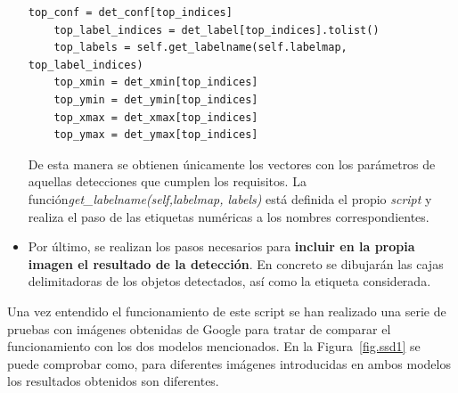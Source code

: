 \begin{itemize}
\begin{lstlisting}[frame=single]
	top_conf = det_conf[top_indices]
	top_label_indices = det_label[top_indices].tolist()
	top_labels = self.get_labelname(self.labelmap, top_label_indices)
	top_xmin = det_xmin[top_indices]
	top_ymin = det_ymin[top_indices]
	top_xmax = det_xmax[top_indices]
	top_ymax = det_ymax[top_indices]
	\end{lstlisting}
	De esta manera se obtienen únicamente los vectores con los parámetros de aquellas detecciones que cumplen los requisitos. La función\textit{get\_labelname(self,labelmap, labels)} está definida el propio \textit{script} y realiza el paso de las etiquetas numéricas a los nombres correspondientes.
	\item Por último, se realizan los pasos necesarios para \textbf{incluir en la propia imagen el resultado de la detección}. En concreto se dibujarán las cajas delimitadoras de los objetos detectados, así como la etiqueta considerada.
\end{itemize}

Una vez entendido el funcionamiento de este script se han realizado una serie de pruebas con imágenes obtenidas de Google para tratar de comparar el funcionamiento con los dos modelos mencionados. En la Figura~\ref{fig.ssd1} se puede comprobar como, para diferentes imágenes introducidas en ambos modelos los resultados obtenidos son diferentes.

